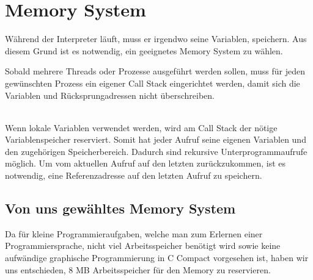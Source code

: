 

\section{Memory System}
\label{sec:memory_system}
Während der Interpreter läuft, muss er irgendwo seine Variablen, speichern. Aus diesem Grund ist es notwendig, ein geeignetes Memory System zu wählen.


Sobald mehrere Threads oder Prozesse ausgeführt werden sollen, muss für jeden gewünschten Prozess ein eigener Call Stack eingerichtet
werden, damit sich die Variablen und Rücksprungadressen nicht überschreiben.

\\
Wenn lokale Variablen verwendet werden, wird am Call Stack der nötige Variablenspeicher reserviert. Somit hat jeder Aufruf seine eigenen Variablen und den zugehörigen Speicherbereich. Dadurch sind rekursive Unterprogrammaufrufe möglich. Um vom aktuellen Aufruf auf den letzten zurückzukommen, ist es notwendig, eine Referenzadresse auf den letzten Aufruf zu speichern.

\subsection{Von uns gewähltes Memory System}
Da für kleine Programmieraufgaben, welche man zum Erlernen einer Programmiersprache, nicht viel Arbeitsspeicher benötigt wird sowie keine aufwändige graphische Programmierung in C Compact vorgesehen ist, haben wir uns entschieden, 8 MB Arbeitsspeicher für den Memory zu reservieren.

